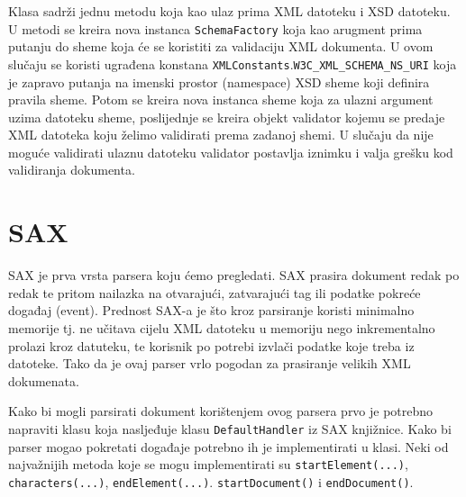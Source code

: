 \documentclass{foi}
\begin{document}
Klasa sadrži jednu metodu koja kao ulaz prima XML datoteku i XSD datoteku.
U metodi se kreira nova instanca \texttt{SchemaFactory} koja kao arugment prima putanju
do sheme koja će se koristiti za validaciju XML dokumenta. U ovom slučaju se koristi
ugrađena konstana \texttt{XMLConstants$.$W3C\_XML\_SCHEMA\_NS\_URI} koja je zapravo
putanja na imenski prostor (namespace) XSD sheme koji definira pravila sheme.
Potom se kreira nova instanca sheme koja za ulazni argument uzima datoteku
sheme, poslijednje se kreira objekt validator kojemu se predaje XML datoteka koju
želimo validirati prema zadanoj shemi. U slučaju da nije moguće validirati ulaznu
datoteku validator postavlja iznimku i valja grešku kod validiranja dokumenta.

\section{SAX}
SAX je prva vrsta parsera koju ćemo pregledati. SAX prasira dokument redak po redak
te pritom nailazka na otvarajući, zatvarajući tag ili podatke pokreće događaj (event).
Prednost SAX-a je što kroz parsiranje koristi minimalno memorije tj. ne učitava cijelu
XML datoteku u memoriju nego inkrementalno prolazi kroz datuteku, te korisnik po potrebi
izvlači podatke koje treba iz datoteke. Tako da je ovaj parser vrlo pogodan za prasiranje
velikih XML dokumenata.

Kako bi mogli parsirati dokument korištenjem ovog parsera prvo je potrebno napraviti
klasu koja nasljeđuje klasu \texttt{DefaultHandler} iz SAX knjižnice. Kako bi parser
mogao pokretati događaje potrebno ih je implementirati u klasi. Neki od najvažnijih
metoda koje se mogu implementirati su \texttt{startElement(...)}, \texttt{characters(...)},
\texttt{endElement(...)}. \texttt{startDocument()} i \texttt{endDocument()}.
\end{document}
